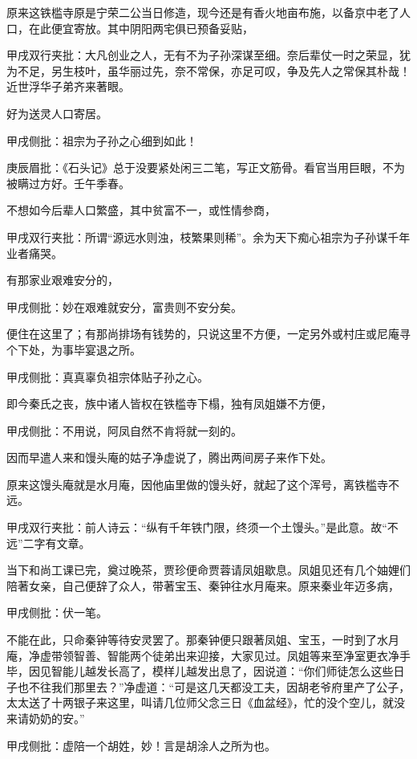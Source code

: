 \begin{parag}
    原来这铁槛寺原是宁荣二公当日修造，现今还是有香火地亩布施，以备京中老了人口，在此便宜寄放。其中阴阳两宅俱已预备妥贴，\begin{note}甲戌双行夹批：大凡创业之人，无有不为子孙深谋至细。奈后辈仗一时之荣显，犹为不足，另生枝叶，虽华丽过先，奈不常保，亦足可叹，争及先人之常保其朴哉！近世浮华子弟齐来著眼。\end{note}好为送灵人口寄居。\begin{note}甲戌侧批：祖宗为子孙之心细到如此！\end{note}\begin{note}庚辰眉批：《石头记》总于没要紧处闲三二笔，写正文筋骨。看官当用巨眼，不为被瞒过方好。壬午季春。\end{note}不想如今后辈人口繁盛，其中贫富不一，或性情参商，\begin{note}甲戌双行夹批：所谓“源远水则浊，枝繁果则稀”。余为天下痴心祖宗为子孙谋千年业者痛哭。\end{note}有那家业艰难安分的，\begin{note}甲戌侧批：妙在艰难就安分，富贵则不安分矣。\end{note}便住在这里了；有那尚排场有钱势的，只说这里不方便，一定另外或村庄或尼庵寻个下处，为事毕宴退之所。\begin{note}甲戌侧批：真真辜负祖宗体贴子孙之心。\end{note}即今秦氏之丧，族中诸人皆权在铁槛寺下榻，独有凤姐嫌不方便，\begin{note}甲戌侧批：不用说，阿凤自然不肯将就一刻的。\end{note}因而早遣人来和馒头庵的姑子净虚说了，腾出两间房子来作下处。
\end{parag}


\begin{parag}
    原来这馒头庵就是水月庵，因他庙里做的馒头好，就起了这个浑号，离铁槛寺不远。\begin{note}甲戌双行夹批：前人诗云：“纵有千年铁门限，终须一个土馒头。”是此意。故“不远”二字有文章。\end{note}当下和尚工课已完，奠过晚茶，贾珍便命贾蓉请凤姐歇息。凤姐见还有几个妯娌们陪著女亲，自己便辞了众人，带著宝玉、秦钟往水月庵来。原来秦业年迈多病，\begin{note}甲戌侧批：伏一笔。\end{note}不能在此，只命秦钟等待安灵罢了。那秦钟便只跟著凤姐、宝玉，一时到了水月庵，净虚带领智善、智能两个徒弟出来迎接，大家见过。凤姐等来至净室更衣净手毕，因见智能儿越发长高了，模样儿越发出息了，因说道：“你们师徒怎么这些日子也不往我们那里去？”净虚道：“可是这几天都没工夫，因胡老爷府里产了公子，太太送了十两银子来这里，叫请几位师父念三日《血盆经》，忙的没个空儿，就没来请奶奶的安。”\begin{note}甲戌侧批：虚陪一个胡姓，妙！言是胡涂人之所为也。\end{note}
\end{parag}



